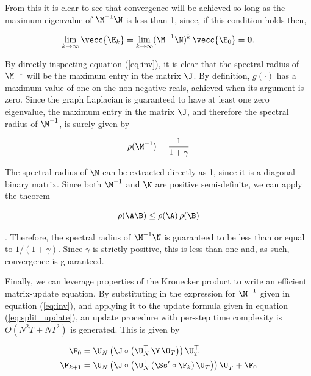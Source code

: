 From this it is clear to see that convergence will be achieved so long as the maximum eigenvalue of $\M^{-1} \N$ is less than 1, since, if this condition holds then, 

\begin{equation}
\lim_{k \rightarrow \infty} \vecc{\E_k} = \lim_{k \rightarrow \infty} (\M^{-1} \N)^{k} \, \vecc{\E_0} = \mathbf{0} .
\end{equation}

By directly inspecting equation (\ref{eq:inv}), it is clear that the spectral radius of $\M^{-1}$ will be the maximum entry in the matrix $\J$. By definition, $g(\cdot)$ has a maximum value of one on the non-negative reals, achieved when its argument is zero. Since the graph Laplacian is guaranteed to have at least one zero eigenvalue, the maximum entry in the matrix $\J$, and therefore the spectral radius of $\M^{-1}$, is surely given by

\begin{equation}
\rho(\M^{-1}) = \frac{1}{1 + \gamma}
\end{equation}

The spectral radius of $\N$ can be extracted directly as 1, since it is a diagonal binary matrix. Since both $\M^{-1}$ and $\N$ are positive semi-definite, we can apply the theorem 

\begin{equation}
\label{eq:psd}
\rho(\A\B) \leq \rho(\A) \, \rho(\B)
\end{equation}

\citep{Bhatia1997}. Therefore, the spectral radius of $\M^{-1}\N$ is guaranteed to be less than or equal to $1 / (1 + \gamma)$.  Since $\gamma$ is strictly positive, this is less than one and, as such, convergence is guaranteed. 

Finally, we can leverage properties of the Kronecker product to write an efficient matrix-update equation. By substituting in the expression for $\M^{-1}$ given in equation (\ref{eq:inv}), and applying it to the update formula given in equation (\ref{eq:split_update}), an update procedure with per-step time complexity is $O(N^2T + NT^2)$ is generated. This is given by 

\begin{align}
\F_0 &= \U_N \, \big( \J  \circ \big( \U_N^\top \, \Y \, \U_T \big) \big) \, \U_T^\top \notag \\ 
\F_{k+1} &= \U_N \, \big( \J  \circ \big( \U_N^\top \, (\Ss' \circ \F_{k})\, \U_T \big) \big) \, \U_T^\top + \F_0
\end{align}

